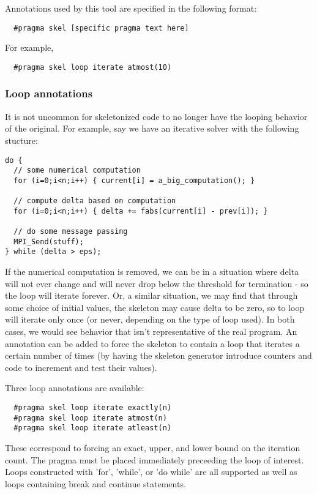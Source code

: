 Annotations used by this tool are specified in the following format:

\begin{verbatim}
  #pragma skel [specific pragma text here]
\end{verbatim}

For example,

\begin{verbatim}
  #pragma skel loop iterate atmost(10)
\end{verbatim}

\subsubsection{Loop annotations}

It is not uncommon for skeletonized code to no longer have the looping
behavior of the original.  For example, say we have an iterative
solver with the following stucture:

\begin{verbatim}
do {
  // some numerical computation
  for (i=0;i<n;i++) { current[i] = a_big_computation(); }

  // compute delta based on computation
  for (i=0;i<n;i++) { delta += fabs(current[i] - prev[i]); }

  // do some message passing
  MPI_Send(stuff);
} while (delta > eps);
\end{verbatim}

If the numerical computation is removed, we can be in a situation
where delta will not ever change and will never drop below the
threshold for termination - so the loop will iterate forever.  Or, a
similar situation, we may find that through some choice of initial
values, the skeleton may cause delta to be zero, so to loop will
iterate only once (or never, depending on the type of loop used).  In
both cases, we would see behavior that isn't representative of the
real program.  An annotation can be added to force the skeleton to
contain a loop that iterates a certain number of times  (by having
the skeleton generator introduce counters and code to increment and
test their values).

Three loop annotations are available:

\begin{verbatim}
  #pragma skel loop iterate exactly(n)
  #pragma skel loop iterate atmost(n)
  #pragma skel loop iterate atleast(n)
\end{verbatim}

These correspond to forcing an exact, upper, and lower bound on the
iteration count.  The pragma must be placed immediately preceeding the
loop of interest.  Loops constructed with 'for', 'while', or 'do while'
are all supported as well as loops containing break and continue statements.

